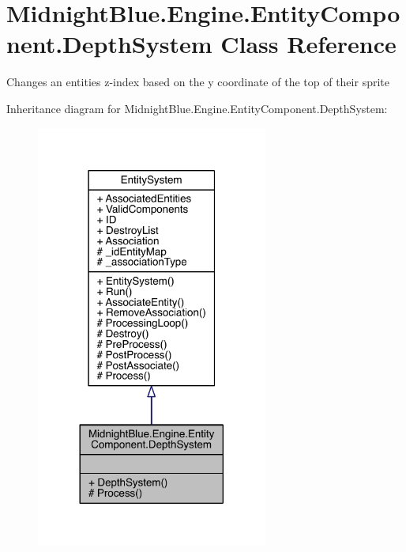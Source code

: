 \hypertarget{class_midnight_blue_1_1_engine_1_1_entity_component_1_1_depth_system}{}\section{Midnight\+Blue.\+Engine.\+Entity\+Component.\+Depth\+System Class Reference}
\label{class_midnight_blue_1_1_engine_1_1_entity_component_1_1_depth_system}


Changes an entities z-\/index based on the y coordinate of the top of their sprite  




Inheritance diagram for Midnight\+Blue.\+Engine.\+Entity\+Component.\+Depth\+System\+:
\nopagebreak
\begin{figure}[H]
\begin{center}
\leavevmode
\includegraphics[width=216pt]{class_midnight_blue_1_1_engine_1_1_entity_component_1_1_depth_system__inherit__graph}
\end{center}
\end{figure}


